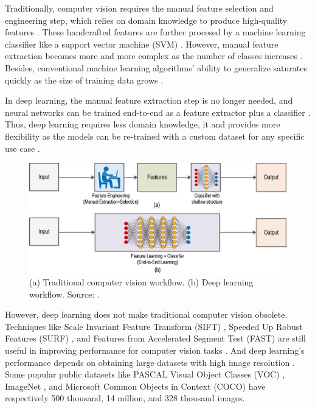\documentclass[a4paper,11pt,oneside]{article}
\begin{document}
  Traditionally, computer vision requires the manual feature selection and engineering step, which relies on domain knowledge
  to produce high-quality features \cite{elgendy2020deep, zhao2019object, o2019deep}. These handcrafted features are further
  procesed by a machine learning classifier like a support vector machine (SVM)
  \cite{elgendy2020deep, zhao2019object, o2019deep}. However, manual feature extraction becomes more and more complex as
  the number of classes increases \cite{o2019deep}. Besides, conventional machine learning algorithms' ability to
  generalize saturates quickly as the size of training data grows \cite{qin2015underwater}.

  In deep learning, the manual feature extraction step is no longer needed, and neural networks can be trained end-to-end
  as a feature extractor plus a classifier \cite{elgendy2020deep, o2019deep}. Thus, deep learning requires less domain
  knowledge, it and provides more flexibility as the models can be re-trained with a custom dataset for any specific use
  case \cite{o2019deep}.

  \begin{figure}[ht]
    \begin{center}
      \includegraphics[width=.8\textwidth]{deep_learning_vs_traditional_computer_vision.png}
    \end{center}
    \caption{(a) Traditional computer vision workflow. (b) Deep learning workflow. Source: \cite{o2019deep}.}
  \end{figure}

  However, deep learning does not make traditional computer vision obsolete. Techniques like Scale Invariant Feature Transform
  (SIFT) \cite{karami2017image}, Speeded Up Robust Features (SURF) \cite{bay2006surf}, and Features from Accelerated
  Segment Test (FAST) \cite{rosten2006machine} are still useful in improving performance for computer vision tasks
  \cite{o2019deep}. And deep learning's performance depends on obtaining large datasets with high image resolution \cite{o2019deep}.
  Some popular public datasets like PASCAL Visual Object Classes (VOC) \cite{everingham2010pascal}, ImageNet
  \cite{russakovsky2015imagenet}, and Microsoft Common Objects in Context (COCO) \cite{lin2014microsoft}
  have respectively 500 thousand, 14 million, and 328 thousand images.
\end{document}
